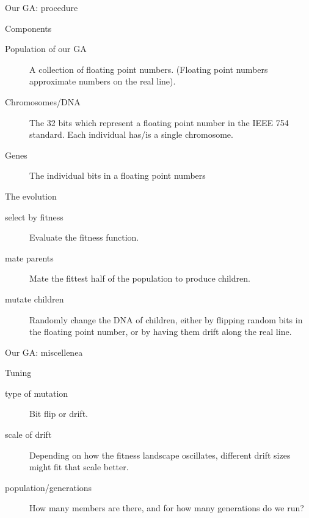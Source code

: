 \documentclass[10pt,aspectratio=169]{beamer}
\begin{document}
\begin{frame}{Our GA: procedure}
  \begin{block}{Components}
  \begin{description}
  \item [Population of our GA] A collection of floating
    point numbers.  (Floating point numbers approximate numbers on the
    real line).\\
  \item [Chromosomes/DNA] The 32 bits which represent a
    floating point number in the IEEE 754 standard.  Each individual
    has/is a single chromosome.
  \item [Genes] The individual bits in a floating point numbers
  \end{description}
  \end{block}
  \pause
  \begin{block}{The evolution}
    \begin{description}
      \item [select by fitness] Evaluate the fitness function.
      \item [mate parents] Mate the fittest half of the population to
        produce children.
      \item [mutate children] Randomly change the DNA of children,
        either by flipping random bits in the floating point number,
        or by having them drift along the real line.
    \end{description}
  \end{block}
\end{frame}

\begin{frame}{Our GA: miscellenea}
  \begin{block}{Tuning}
          \begin{description}
          \item [type of mutation] Bit flip or drift.
          \item [scale of drift] Depending on how the fitness landscape
            oscillates, different drift sizes might fit that scale better.
        \item [population/generations] How many members are there, and
          for how many generations do we run?
        \end{description}
  \end{block}
\end{frame}
\end{document}
